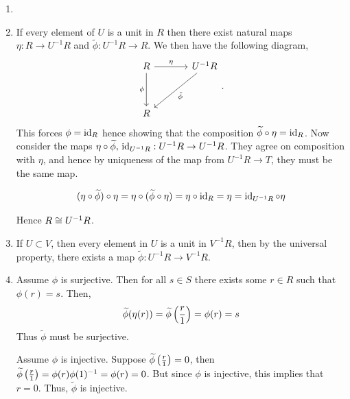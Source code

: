 \documentclass[Notebook.tex]{subfiles}
\begin{document}
\begin{solution}
	\bbni
	\begin{enumerate}
		\item\todo{}

		\item If every element of $U$ is a unit in $R$ then there exist natural maps $\eta: R \to U^{-1}R$ and $\widetilde{\phi}: U^{-1}R \to R$. We then have the following diagram, 
		\[
		\begin{tikzcd}[row sep = 3.5em, column sep = 3.5em]
		R \arrow[r, "\eta"] \arrow[d, swap, "\phi"] & U^{-1}R \arrow[dl, "\tilde{\phi}"] \\
		R  & 
		\end{tikzcd}.
		\]
		This forces $\phi = \operatorname{id}_R$ hence showing that the composition $ \widetilde{\phi} \circ \eta = \operatorname{id}_R$. Now consider the maps $\eta \circ \widetilde{\phi}, \, \operatorname{id}_{U^{-1}R}:U^{-1}R \to U^{-1}R$. They agree on composition with $\eta$, and hence by uniqueness of the map from $U^{-1}R \to T$, they must be the same map.  

		\[(\eta \circ \widetilde{\phi}) \circ \eta = \eta \circ (\widetilde{\phi} \circ \eta) = \eta \circ \operatorname{id}_R = \eta = \operatorname{id}_{U^{-1}R} \circ \eta\]
		
		Hence $R \cong U^{-1}R$. 

		\item If $U \subset V$, then every element in $U$ is a unit in $V^{-1}R$, then by the universal property, there exists a map $\widetilde{\phi}: U^{-1}R \to V^{-1}R$.  
		
		\item Assume $\phi$ is surjective. Then for all $s \in S$ there exists some $r \in R$ such that $\phi(r) = s$. Then, 
		\[\widetilde{\phi}(\eta(r)) = \widetilde{\phi}\left(\frac{r}{1}\right) = \phi(r) = s\]
		Thus $\widetilde{\phi}$ must be surjective. 
		
		Assume $\phi$ is injective. Suppose $\widetilde{\phi}\left(\frac{r}{1}\right) = 0$, then $\widetilde{\phi}\left(\frac{r}{1}\right) = \phi(r)\phi(1)^{-1}  = \phi(r) = 0$. But since $\phi$ is injective, this implies that $r = 0$. Thus, $\widetilde{\phi}$ is injective. 
		
	\end{enumerate}
\end{solution}

\newpage

\hrulefill
\end{document}
